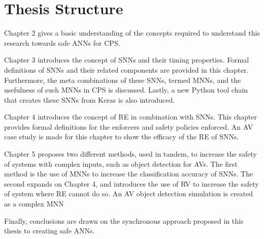 \section{Thesis Structure}
Chapter 2 gives a basic understanding of the concepts required to understand this research towards safe \acp{ANN} for \ac{CPS}.

Chapter 3 introduces the concept of \acfp{SNN} and their timing properties.
Formal definitions of \acp{SNN} and their related components are provided in this chapter.
Furthermore, the meta combinations of these \acp{SNN}, termed \acp{MNN}, and the usefulness of such \acp{MNN} in \ac{CPS} is discussed.
Lastly, a new Python tool chain that creates these \acp{SNN} from Keras is also introduced.

Chapter 4 introduces the concept of \acf{RE} in combination with \acp{SNN}. 
This chapter provides formal definitions for the enforcers and safety policies enforced.
An \acf{AV} case study is made for this chapter to show the efficacy of the \ac{RE} of \acp{SNN}.

Chapter 5 proposes two different methods, used in tandem, to increase the safety of systems with complex inputs, such as object detection for \acp{AV}.
The first method is the use of \acp{MNN} to increase the classification accuracy of \acp{SNN}.
The second expands on Chapter 4, and introduces the use of \ac{RV} to increase the safety of system where \ac{RE} cannot do so.
An \ac{AV} object detection simulation is created as a complex \ac{MNN} 

Finally, conclusions are drawn on the synchronous approach proposed in this thesis to creating safe \acp{ANN}.

